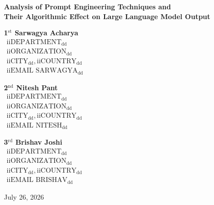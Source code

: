 \documentclass{article}
\begin{document}
\begin{center}
{\Large \textbf{Analysis of Prompt Engineering Techniques and\\ Their Algorithmic Effect on Large Language Model Output}}
\end{center}

\vspace{1em}

\begin{minipage}[t]{0.32\textwidth}
\centering
\textbf{1$^{\text{st}}$ Sarwagya Acharya} \\
$\begin{matrix} \text{iiDEPARTMENT}_{\text{dd}} \\ \text{iiORGANIZATION}_{\text{dd}} \\ \text{iiCITY}_{\text{dd}}, \text{iiCOUNTRY}_{\text{dd}} \\ \text{iiEMAIL SARWAGYA}_{\text{dd}} \end{matrix}$
\end{minipage}
\begin{minipage}[t]{0.32\textwidth}
\centering
\textbf{2$^{\text{nd}}$ Nitesh Pant} \\
$\begin{matrix} \text{iiDEPARTMENT}_{\text{dd}} \\ \text{iiORGANIZATION}_{\text{dd}} \\ \text{iiCITY}_{\text{dd}}, \text{iiCOUNTRY}_{\text{dd}} \\ \text{iiEMAIL NITESH}_{\text{dd}} \end{matrix}$
\end{minipage}
\begin{minipage}[t]{0.32\textwidth}
\centering
\textbf{3$^{\text{rd}}$ Brishav Joshi} \\
$\begin{matrix} \text{iiDEPARTMENT}_{\text{dd}} \\ \text{iiORGANIZATION}_{\text{dd}} \\ \text{iiCITY}_{\text{dd}}, \text{iiCOUNTRY}_{\text{dd}} \\ \text{iiEMAIL BRISHAV}_{\text{dd}} \end{matrix}$
\end{minipage}

\vspace{1em}

\begin{center}
July 26, 2026
\end{center}

\vspace{1em}
\end{document}
